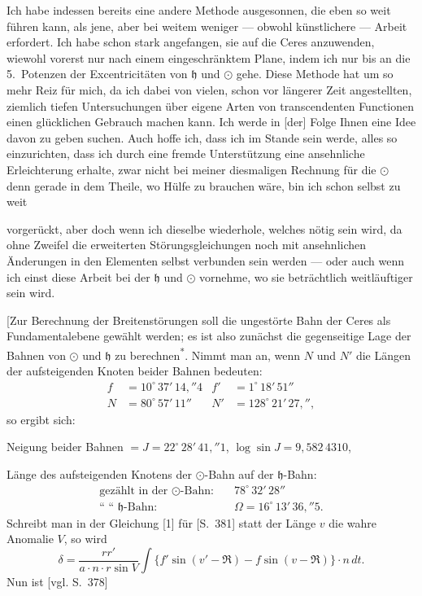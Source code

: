 \documentclass[12pt,a4paper]{article}
\newcommand{\Ceres}{\odot}
\newcommand{\Jupiter}{\mathfrak{h}}
\begin{document}
Ich habe indessen bereits eine andere Methode ausgesonnen, die eben so weit führen kann, als jene, aber bei weitem weniger --- obwohl künstlichere --- Arbeit erfordert. Ich habe schon stark angefangen, sie auf die Ceres anzuwenden, wiewohl vorerst nur nach einem eingeschränktem Plane, indem ich nur bis an die 5.~Potenzen der Excentricitäten von $\Jupiter$ und $\Ceres$ gehe. Diese Methode hat um so mehr Reiz für mich, da ich dabei von vielen, schon vor längerer Zeit angestellten, ziemlich tiefen Untersuchungen über eigene Arten von transcendenten Functionen einen glücklichen Gebrauch machen kann. Ich werde in [der] Folge Ihnen eine Idee davon zu geben suchen. Auch hoffe ich, dass ich im Stande sein werde, alles so einzurichten, dass ich durch eine fremde Unterstützung eine ansehnliche Erleichterung erhalte, zwar nicht bei meiner diesmaligen Rechnung für die $\Ceres$ denn gerade in dem Theile, wo Hülfe zu brauchen wäre, bin ich schon selbst zu weit

\newpage
\setcounter{page}{412}
%
vorgerückt, aber doch wenn ich dieselbe wiederhole, welches nötig sein wird, da ohne Zweifel die erweiterten Störungsgleichungen noch mit ansehnlichen Änderungen in den Elementen selbst verbunden sein werden --- oder auch wenn ich einst diese Arbeit bei der $\Jupiter$ und $\Ceres$ vornehme, wo sie beträchtlich weitläuftiger sein wird.

[Zur Berechnung der Breitenstörungen soll die ungestörte Bahn der Ceres als Fundamentalebene gewählt werden; es ist also zunächst die gegenseitige Lage der Bahnen von $\Ceres$ und $\Jupiter$ zu berechnen\textsuperscript{*}. Nimmt man an, wenn $N$ und $N'$ die Längen der aufsteigenden Knoten beider Bahnen bedeuten:
\begin{align*}
f &= 10^\circ\,37'\,14{,}''4 & f' &= 1^\circ\,18'\,51''\\
N &= 80^\circ\,57'\,11'' & N' &= 128^\circ\,21'\,27{,}'',
\end{align*}
so ergibt sich:

Neigung beider Bahnen $= J = 22^\circ\,28'\,41{,}''1$, $\log \sin J = 9{,}582\,4310$,

Länge des aufsteigenden Knotens der $\Ceres$-Bahn auf der $\Jupiter$-Bahn:
\begin{align*}
\text{gezählt in der $\Ceres$-Bahn:} &\quad 78^\circ\,32'\,28''\\
\text{`` `` $\Jupiter$-Bahn:} &\quad \Omega = 16^\circ\,13'\,36{,}''5.
\end{align*}
Schreibt man in der Gleichung [1] für [S.~381] statt der Länge $v$ die wahre Anomalie $V$, so wird
\[\delta = \frac{r r'}{a \cdot n \cdot r \sin V} \int \bigl\{f' \sin(v' - \mathfrak{R}) - f \sin(v - \mathfrak{R})\bigr\} \cdot n\,dt.\]
Nun ist [vgl. S.~378]
\end{document}

